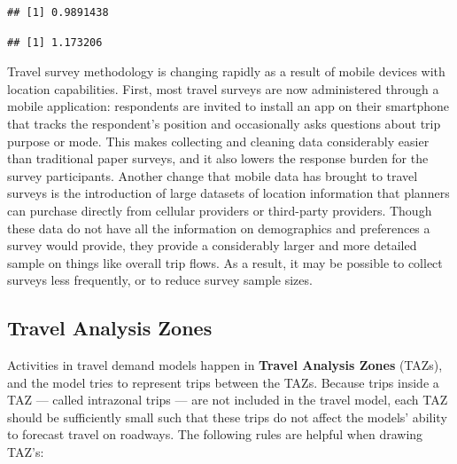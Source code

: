 \documentclass[
]{book}
\newenvironment{Shaded}{\begin{snugshade}}{\end{snugshade}}
\newcommand{\CommentTok}[1]{\textcolor[rgb]{0.56,0.35,0.01}{\textit{#1}}}
\newcommand{\KeywordTok}[1]{\textcolor[rgb]{0.13,0.29,0.53}{\textbf{#1}}}
\newcommand{\NormalTok}[1]{#1}
\newcommand{\OperatorTok}[1]{\textcolor[rgb]{0.81,0.36,0.00}{\textbf{#1}}}
\begin{document}
\begin{Shaded}
\end{Shaded}

\begin{verbatim}
## [1] 0.9891438
\end{verbatim}

\begin{Shaded}
\end{Shaded}

\begin{verbatim}
## [1] 1.173206
\end{verbatim}

Travel survey methodology is changing rapidly as a result of mobile devices with
location capabilities. First, most travel surveys are now administered through a
mobile application: respondents are invited to install an app on their smartphone
that tracks the respondent's position and occasionally asks questions about
trip purpose or mode. This makes collecting and cleaning data considerably easier
than traditional paper surveys, and it also lowers the response burden for the
survey participants. Another change that mobile data has brought to travel surveys
is the introduction of large datasets of location information that planners can
purchase directly from cellular providers or third-party providers. Though these
data do not have all the information on demographics and preferences a survey
would provide, they provide a considerably larger and more detailed sample
on things like overall trip flows. As a result, it may be possible to collect
surveys less frequently, or to reduce survey sample sizes.

\hypertarget{travel-analysis-zones}{%
\subsection{Travel Analysis Zones}\label{travel-analysis-zones}}

Activities in travel demand models happen in \textbf{Travel Analysis Zones} (TAZs), and
the model tries to represent trips between the TAZs. Because trips inside a TAZ
--- called intrazonal trips --- are not included in the travel model, each TAZ should
be sufficiently small such that these trips do not affect the models' ability
to forecast travel on roadways. The following rules are helpful when drawing
TAZ's:
\end{document}
